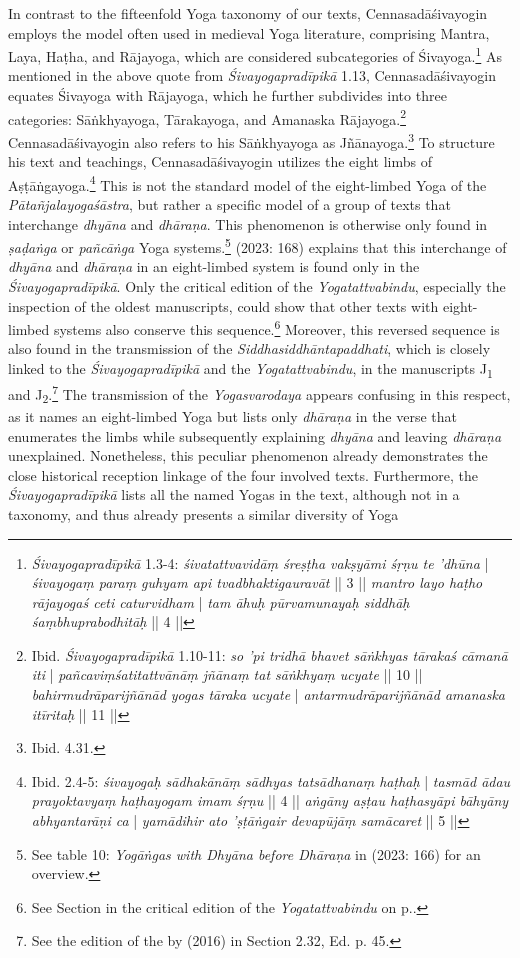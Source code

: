 In contrast to the fifteenfold Yoga taxonomy of our texts, Cennasadāśivayogin employs the model often used in medieval Yoga literature, comprising Mantra, Laya, Haṭha, and Rājayoga, which are considered subcategories of Śivayoga.\footnote{\textit{Śivayogapradīpikā} 1.3-4: \textit{śivatattvavidāṃ śreṣṭha vakṣyāmi śṛṇu te 'dhūna} | \textit{śivayogaṃ paraṃ guhyam api tvadbhaktigauravāt} || 3 || \textit{mantro layo haṭho rājayogaś ceti caturvidham} | \textit{tam āhuḥ pūrvamunayaḥ siddhāḥ śaṃbhuprabodhitāḥ} || 4 ||} As mentioned in the above quote from \textit{Śivayogapradīpikā} 1.13, Cennasadāśivayogin equates Śivayoga with Rājayoga, which he further subdivides into three categories: Sāṅkhyayoga, Tārakayoga, and Amanaska Rājayoga.\footnote{Ibid. \textit{Śivayogapradīpikā} 1.10-11: \textit{so 'pi tridhā bhavet sāṅkhyas tārakaś cāmanā iti} | \textit{pañcaviṃśatitattvānāṃ jñānaṃ tat sāṅkhyaṃ ucyate} || 10 || \textit{bahirmudrāparijñānād yogas tāraka ucyate} | \textit{antarmudrāparijñānād amanaska itīritaḥ} || 11 ||} Cennasadāśivayogin also refers to his Sāṅkhyayoga as Jñānayoga.\footnote{Ibid. 4.31.} To structure his text and teachings, Cennasadāśivayogin utilizes the eight limbs of Aṣṭāṅgayoga.\footnote{Ibid. 2.4-5: \textit{śivayogaḥ sādhakānāṃ sādhyas tatsādhanaṃ haṭhaḥ} | \textit{tasmād ādau prayoktavyaṃ haṭhayogam imam śṛṇu} || 4 || \textit{aṅgāny aṣṭau haṭhasyāpi bāhyāny abhyantarāṇi ca} | \textit{yamādihir ato 'ṣṭāṅgair devapūjāṃ samācaret} || 5 ||} This is not the standard model of the eight-limbed Yoga of the \textit{Pātañjalayogaśāstra}, but rather a specific model of a group of texts that interchange \textit{dhyāna} and \textit{dhāraṇa}. This phenomenon is otherwise only found in \textit{ṣaḍaṅga} or \textit{pañcāṅga} Yoga systems.\footnote{See table 10: \textit{Yogāṅgas with Dhyāna before Dhāraṇa} in \citeauthor{powell2023} (2023: 166) for an overview.} \citeauthor{powell2023} (2023: 168) explains that this interchange of \textit{dhyāna} and \textit{dhāraṇa} in an eight-limbed system is found only in the \textit{Śivayogapradīpikā}. Only the critical edition of the \textit{Yogatattvabindu}, especially the inspection of the oldest manuscripts, could show that other texts with eight-limbed systems also conserve this sequence.\footnote{See Section  in the critical edition of the \textit{Yogatattvabindu} on p.\pageref{ashtanga}.} Moreover, this reversed sequence is also found in the transmission of the \textit{Siddhasiddhāntapaddhati}, which is closely linked to the \textit{Śivayogapradīpikā} and the \textit{Yogatattvabindu}, in the manuscripts J\textsubscript{1} and J\textsubscript{2}.\footnote{See the edition of the  by \citeauthor{ssplonavla} (2016) in Section 2.32, Ed. p. 45.} The transmission of the \textit{Yogasvarodaya} appears confusing in this respect, as it names an eight-limbed Yoga but lists only \textit{dhāraṇa} in the verse that enumerates the limbs while subsequently explaining \textit{dhyāna} and leaving \textit{dhāraṇa} unexplained. Nonetheless, this peculiar phenomenon already demonstrates the close historical reception linkage of the four involved texts. Furthermore, the \textit{Śivayogapradīpikā} lists all the named Yogas in the text, although not in a taxonomy, and thus already presents a similar diversity of Yoga 